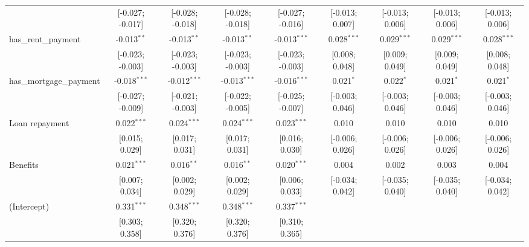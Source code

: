 \begin{table}[htbp]
\begin{threeparttable}[b]
\begin{tabular}{lcccccccc}
                                   & [-0.027; -0.017]               & [-0.028; -0.018]  & [-0.028; -0.018]              & [-0.027; -0.016] & [-0.013; 0.007] & [-0.013; 0.006]  & [-0.013; 0.006]  & [-0.013; 0.006]\\   
         has\_rent\_payment        & -0.013$^{**}$                  & -0.013$^{**}$     & -0.013$^{**}$                 & -0.013$^{***}$   & 0.028$^{***}$   & 0.029$^{***}$    & 0.029$^{***}$    & 0.028$^{***}$\\   
                                   & [-0.023; -0.003]               & [-0.023; -0.003]  & [-0.023; -0.003]              & [-0.023; -0.003] & [0.008; 0.048]  & [0.009; 0.049]   & [0.009; 0.049]   & [0.008; 0.048]\\   
         has\_mortgage\_payment    & -0.018$^{***}$                 & -0.012$^{***}$    & -0.013$^{***}$                & -0.016$^{***}$   & 0.021$^{*}$     & 0.022$^{*}$      & 0.021$^{*}$      & 0.021$^{*}$\\   
                                   & [-0.027; -0.009]               & [-0.021; -0.003]  & [-0.022; -0.005]              & [-0.025; -0.007] & [-0.003; 0.046] & [-0.003; 0.046]  & [-0.003; 0.046]  & [-0.003; 0.046]\\   
         Loan repayment            & 0.022$^{***}$                  & 0.024$^{***}$     & 0.024$^{***}$                 & 0.023$^{***}$    & 0.010           & 0.010            & 0.010            & 0.010\\   
                                   & [0.015; 0.029]                 & [0.017; 0.031]    & [0.017; 0.031]                & [0.016; 0.030]   & [-0.006; 0.026] & [-0.006; 0.026]  & [-0.006; 0.026]  & [-0.006; 0.026]\\   
         Benefits                  & 0.021$^{***}$                  & 0.016$^{**}$      & 0.016$^{**}$                  & 0.020$^{***}$    & 0.004           & 0.002            & 0.003            & 0.004\\   
                                   & [0.007; 0.034]                 & [0.002; 0.029]    & [0.002; 0.029]                & [0.006; 0.033]   & [-0.034; 0.042] & [-0.035; 0.040]  & [-0.035; 0.040]  & [-0.034; 0.042]\\   
         (Intercept)               & 0.331$^{***}$                  & 0.348$^{***}$     & 0.348$^{***}$                 & 0.337$^{***}$    &                 &                  &                  &   \\   
                                   & [0.303; 0.358]                 & [0.320; 0.376]    & [0.320; 0.376]                & [0.310; 0.365]   &                 &                  &                  &   \\   

\end{tabular}
\end{threeparttable}
\end{table}
